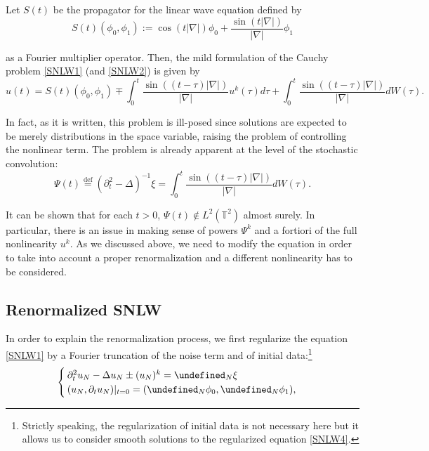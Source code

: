 \documentclass[letterpaper, 11pt,  reqno]{amsart}
\newcommand{\1}{\hspace{0.5mm}\text{I}\hspace{0.5mm}}
\newcommand{\noi}{\noindent}
\newcommand{\T}{\mathbb{T}}
\let\P= \undefined
\newcommand{\P}{\mathbf{P}}
\newcommand{\Dl}{\Delta}
\newcommand{\dt}{\partial_t}
\numberwithin{equation}{section}
\numberwithin{theorem}{section}
\begin{document}
Let $S(t)$ be the propagator for the linear wave equation
defined by 
\begin{equation*}%
S(t)(\phi_0, \phi_1):=\cos(t|\nabla|)\phi_0+\frac{\sin (t|\nabla|)}{|\nabla|}\phi_1
\end{equation*}


\noi
as a Fourier multiplier operator.
Then, the mild formulation 
of the Cauchy problem \eqref{SNLW1} (and \eqref{SNLW2})
is given by 
\begin{equation*}
u(t)=S(t)(\phi_0, \phi_1)
\mp \int_{0}^t \frac{\sin ((t-\tau)|\nabla|)}{|\nabla|}u^k(\tau)d\tau
+ \int_{0}^t \frac{\sin ((t-\tau)|\nabla|)}{|\nabla|}dW(\tau).
\end{equation*}
	
\noi
In fact, as it is written, this problem is ill-posed since solutions are expected to be merely distributions in the space variable, raising the problem of controlling the nonlinear term. The problem is already apparent at the level of  the stochastic convolution: %
\begin{equation}
\Psi(t) \stackrel{\text{def}}{=} 
(\dt^2 - \Dl)^{-1} \xi
=  \int_{0}^t \frac{\sin ((t-\tau)|\nabla|)}{|\nabla|}dW(\tau).
\label{sconv1}
\end{equation}

\noi
It can be shown that for each $t> 0$, $\Psi (t)\notin L^2(\T^2)$ almost surely.
In particular, there is an issue in making sense of powers
$\Psi^k$ and a fortiori of the full nonlinearity $u^k$. 
As we discussed above, 
we need to modify  the equation in order to take into account a proper renormalization and a different nonlinearity has to be considered. 




\subsection{Renormalized SNLW}
In order to explain the renormalization process,
 we first regularize the equation \eqref{SNLW1} by a Fourier truncation of the noise term and of initial data:\footnote{Strictly speaking, the regularization of initial data is not necessary here but it allows
 us to consider smooth solutions to the regularized equation \eqref{SNLW4}.}
\begin{align}
\begin{cases}
\dt^2 u_N -  \Dl  u_N   \pm  ( u_N)^k   = \P_N \xi \\ 
(u_N, \dt u_N) |_{t = 0} = (\P_N\phi_0, \P_N\phi_1),
\end{cases}
\label{SNLW4}
\end{align}
\end{document}
